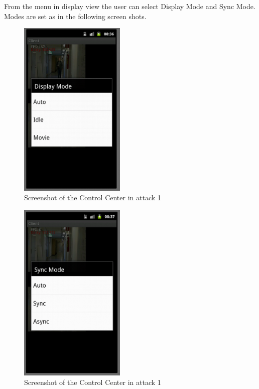\documentclass[8pt,titlepage]{article}
\begin{document}
From the menu in display view the user can select Display Mode and Sync Mode. Modes are set as in the following screen shots.

\begin{figure}[hbp]
\includegraphics[width=0.45\textwidth]{../screenshots/androidDisplayMode.png}
\caption{Screenshot of the Control Center in attack 1}
\end{figure}

\begin{figure}[hbp]
\includegraphics[width=0.45\textwidth]{../screenshots/androidSyncMode.png}
\caption{Screenshot of the Control Center in attack 1}
\end{figure}
\end{document}
